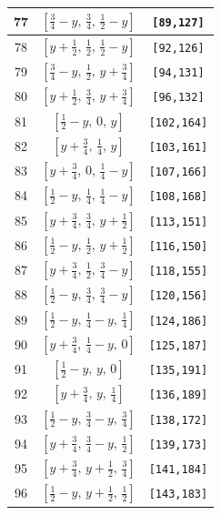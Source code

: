 \documentclass[fleqn,8pt]{jsarticle}
\begin{document}
\begin{longtable}{ccc}
77 & $\left[ \frac{3}{4} - y,\, \frac{3}{4},\, \frac{1}{2} - y \right]$ & {\tt [89,127]} \\ \hline
78 & $\left[ y + \frac{1}{2},\, \frac{1}{2},\, \frac{1}{2} - y \right]$ & {\tt [92,126]} \\ \hline
79 & $\left[ \frac{3}{4} - y,\, \frac{1}{2},\, y + \frac{3}{4} \right]$ & {\tt [94,131]} \\ \hline
80 & $\left[ y + \frac{1}{2},\, \frac{3}{4},\, y + \frac{3}{4} \right]$ & {\tt [96,132]} \\ \hline
81 & $\left[ \frac{1}{2} - y,\, 0,\, y \right]$ & {\tt [102,164]} \\ \hline
82 & $\left[ y + \frac{3}{4},\, \frac{1}{4},\, y \right]$ & {\tt [103,161]} \\ \hline
83 & $\left[ y + \frac{3}{4},\, 0,\, \frac{1}{4} - y \right]$ & {\tt [107,166]} \\ \hline
84 & $\left[ \frac{1}{2} - y,\, \frac{1}{4},\, \frac{1}{4} - y \right]$ & {\tt [108,168]} \\ \hline
85 & $\left[ y + \frac{3}{4},\, \frac{3}{4},\, y + \frac{1}{2} \right]$ & {\tt [113,151]} \\ \hline
86 & $\left[ \frac{1}{2} - y,\, \frac{1}{2},\, y + \frac{1}{2} \right]$ & {\tt [116,150]} \\ \hline
87 & $\left[ y + \frac{3}{4},\, \frac{1}{2},\, \frac{3}{4} - y \right]$ & {\tt [118,155]} \\ \hline
88 & $\left[ \frac{1}{2} - y,\, \frac{3}{4},\, \frac{3}{4} - y \right]$ & {\tt [120,156]} \\ \hline
89 & $\left[ \frac{1}{2} - y,\, \frac{1}{4} - y,\, \frac{1}{4} \right]$ & {\tt [124,186]} \\ \hline
90 & $\left[ y + \frac{3}{4},\, \frac{1}{4} - y,\, 0 \right]$ & {\tt [125,187]} \\ \hline
91 & $\left[ \frac{1}{2} - y,\, y,\, 0 \right]$ & {\tt [135,191]} \\ \hline
92 & $\left[ y + \frac{3}{4},\, y,\, \frac{1}{4} \right]$ & {\tt [136,189]} \\ \hline
93 & $\left[ \frac{1}{2} - y,\, \frac{3}{4} - y,\, \frac{3}{4} \right]$ & {\tt [138,172]} \\ \hline
94 & $\left[ y + \frac{3}{4},\, \frac{3}{4} - y,\, \frac{1}{2} \right]$ & {\tt [139,173]} \\ \hline
95 & $\left[ y + \frac{3}{4},\, y + \frac{1}{2},\, \frac{3}{4} \right]$ & {\tt [141,184]} \\ \hline
96 & $\left[ \frac{1}{2} - y,\, y + \frac{1}{2},\, \frac{1}{2} \right]$ & {\tt [143,183]} \\ \hline

\end{longtable}
\end{document}
